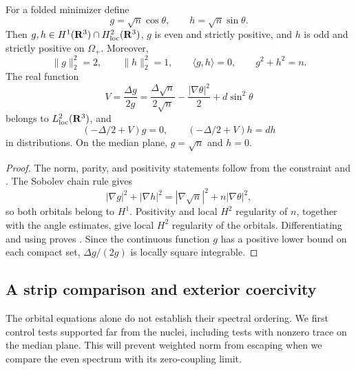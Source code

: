 \begin{proposition}
\label{prop:orbital-equations}
For a folded minimizer define
\begin{equation}\label{eq:angle-orbitals}
 g=\sqrt n\cos\theta,\qquad h=\sqrt n\sin\theta.
\end{equation}
Then \(g,h\in H^1(\mathbf R^3)\cap H^2_{\mathrm{loc}}(\mathbf R^3)\),
\(g\) is even and strictly positive, and \(h\) is odd and strictly
positive on \(\Omega_+\).  Moreover,
\[
 \|g\|_2^2=2,\qquad \|h\|_2^2=1,\qquad
 \langle g,h\rangle=0,\qquad g^2+h^2=n.
\]
The real function
\begin{equation}\label{eq:formal-potential}
 V=\frac{\Delta g}{2g}
   =\frac{\Delta\sqrt n}{2\sqrt n}
        -\frac{|\nabla\theta|^2}{2}+d\sin^2\theta
\end{equation}
belongs to \(L^2_{\mathrm{loc}}(\mathbf R^3)\), and
\begin{equation}\label{eq:orbital-equations}
 (-\Delta/2+V)g=0,\qquad
 (-\Delta/2+V)h=dh
\end{equation}
in distributions.  On the median plane, \(g=\sqrt n\) and \(h=0\).
\end{proposition}

\begin{proof}
The norm, parity, and positivity statements follow from the constraint
and .  The Sobolev chain rule gives
\begin{equation}\label{eq:angle-kinetic-identity}
 |\nabla g|^2+|\nabla h|^2
       =|\nabla\sqrt n|^2+n|\nabla\theta|^2,
\end{equation}
so both orbitals belong to \(H^1\).  Positivity and local \(H^2\)
regularity of \(n\), together with the angle estimates, give local
\(H^2\) regularity of the orbitals.  Differentiating
 and using  proves
.
Since the continuous function \(g\) has a positive lower bound on
each compact set, \(\Delta g/(2g)\) is locally square integrable.
\end{proof}

\subsection{A strip comparison and exterior coercivity}

The orbital equations alone do not establish their spectral ordering.
We first control tests supported far from the nuclei, including tests
with nonzero trace on the median plane.  This will prevent weighted
norm from escaping when we compare the even spectrum with its
zero-coupling limit.

